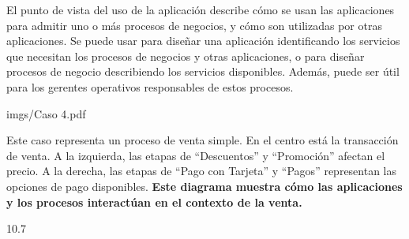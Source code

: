 



{
  El punto de vista del uso de la aplicación describe cómo se usan las aplicaciones para admitir uno o más procesos de negocios, y cómo son utilizadas por otras aplicaciones. Se puede usar para diseñar una aplicación identificando los servicios que necesitan los procesos de negocios y otras aplicaciones, o para diseñar procesos de negocio describiendo los servicios disponibles. Además, puede ser útil para los gerentes operativos responsables de estos procesos. \cite{definicion_capas}

}
{imgs/Caso 4.pdf}
{
   Este caso representa un proceso de venta simple. En el centro está la transacción de venta. A la izquierda, las etapas de ``Descuentos'' y ``Promoción'' afectan el precio. A la derecha, las etapas de ``Pago con Tarjeta'' y ``Pagos'' representan las opciones de pago disponibles. \textbf{Este diagrama muestra cómo las aplicaciones y los procesos interactúan en el contexto de la venta. }
    
}{1}{0.7}
